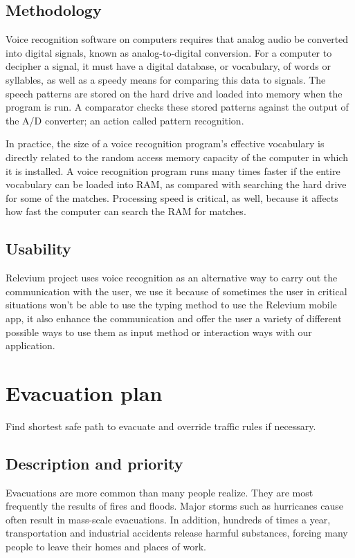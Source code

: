 \documentclass{scrreprt}
\begin{document}
\subsection{Methodology}

Voice recognition software on computers requires that analog audio be converted into digital signals, known as analog-to-digital conversion. For a computer to decipher a signal, it must have a digital database, or vocabulary, of words or syllables, as well as a speedy means for comparing this data to signals. The speech patterns are stored on the hard drive and loaded into memory when the program is run. A comparator checks these stored patterns against the output of the A/D converter; an action called pattern recognition.

In practice, the size of a voice recognition program's effective vocabulary is directly related to the random access memory capacity of the computer in which it is installed. A voice recognition program runs many times faster if the entire vocabulary can be loaded into RAM, as compared with searching the hard drive for some of the matches. Processing speed is critical, as well, because it affects how fast the computer can search the RAM for matches.

\subsection{Usability}

Relevium project uses voice recognition as an alternative way to carry out the communication with the user, we use it because of sometimes the user in critical situations won’t be able to use the typing method to use the Relevium mobile app, it also enhance the communication and offer the user a variety of different possible ways to use them as input method or interaction ways with our application.

\newpage




\section{Evacuation plan}
Find shortest safe path to evacuate and override traffic rules if necessary.


\subsection{Description and priority}

Evacuations are more common than many people realize. They are most frequently the results of fires and floods. Major storms such as hurricanes cause often result in mass-scale evacuations. In addition, hundreds of times a year, transportation and industrial accidents release harmful substances, forcing many people to leave their homes and places of work.
\end{document}
